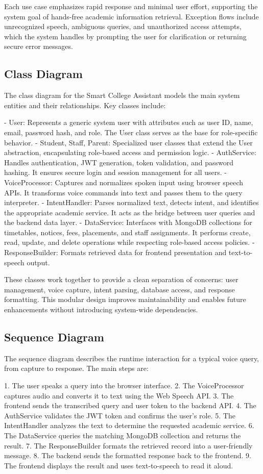 \documentclass{article}
\begin{document}
Each use case emphasizes rapid response and minimal user effort, supporting the system goal of hands-free academic information retrieval. Exception flows include unrecognized speech, ambiguous queries, and unauthorized access attempts, which the system handles by prompting the user for clarification or returning secure error messages.

\subsection{Class Diagram}
The class diagram for the Smart College Assistant models the main system entities and their relationships. Key classes include:

- User: Represents a generic system user with attributes such as user ID, name, email, password hash, and role. The User class serves as the base for role-specific behavior.
- Student, Staff, Parent: Specialized user classes that extend the User abstraction, encapsulating role-based access and permission logic.
- AuthService: Handles authentication, JWT generation, token validation, and password hashing. It ensures secure login and session management for all users.
- VoiceProcessor: Captures and normalizes spoken input using browser speech APIs. It transforms voice commands into text and passes them to the query interpreter.
- IntentHandler: Parses normalized text, detects intent, and identifies the appropriate academic service. It acts as the bridge between user queries and the backend data layer.
- DataService: Interfaces with MongoDB collections for timetables, notices, fees, placements, and staff assignments. It performs create, read, update, and delete operations while respecting role-based access policies.
- ResponseBuilder: Formats retrieved data for frontend presentation and text-to-speech output.

These classes work together to provide a clean separation of concerns: user management, voice capture, intent parsing, database access, and response formatting. This modular design improves maintainability and enables future enhancements without introducing system-wide dependencies.

\subsection{Sequence Diagram}
The sequence diagram describes the runtime interaction for a typical voice query, from capture to response. The main steps are:

1. The user speaks a query into the browser interface.
2. The VoiceProcessor captures audio and converts it to text using the Web Speech API.
3. The frontend sends the transcribed query and user token to the backend API.
4. The AuthService validates the JWT token and confirms the user's role.
5. The IntentHandler analyzes the text to determine the requested academic service.
6. The DataService queries the matching MongoDB collection and returns the result.
7. The ResponseBuilder formats the retrieved record into a user-friendly message.
8. The backend sends the formatted response back to the frontend.
9. The frontend displays the result and uses text-to-speech to read it aloud.
\end{document}
